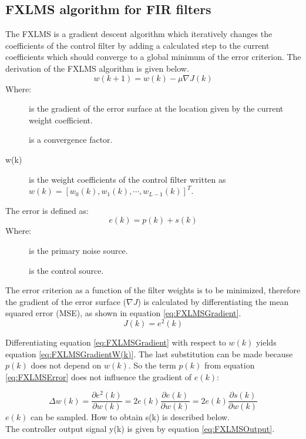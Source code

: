 \subsection{FXLMS algorithm for FIR filters}\label{subsec:fxlms}
The FXLMS is a gradient descent algorithm which iteratively changes the coefficients of the control filter by adding a calculated step to the current coefficients which should converge to a global minimum of the error criterion. The derivation of the FXLMS algorithm is given below. 
\begin{equation}\label{eq:FXLMSNewCoef}
w(k+1) = w(k) - \mu\nabla J(k)
\end{equation}
Where:
\begin{description}
	\item[] is the gradient of the error surface at the location given by the current weight coefficient.
	\item[\text{$\mu$}] is a convergence factor.
	\item[w(k)] is the weight coefficients of the control filter written as  $w(k)=[w_0(k),w_1(k) ,\cdots, w_{L-1}(k)]^T$.
\end{description}
The error is defined as:
\begin{equation}\label{eq:FXLMSError}
e(k) = p(k) + s(k)
\end{equation}
Where:
\begin{description}
	\item[] is the primary noise source.
	\item[] is the control source.
\end{description}

The error criterion as a function of the filter weights is to be minimized, therefore the gradient of the error surface ($\nabla J$) is calculated by differentiating the mean squared error (MSE), as shown in equation \ref{eq:FXLMSGradient}.
\begin{equation}\label{eq:FXLMSGradient}
J(k) = e^2(k)
\end{equation}

Differentiating equation \ref{eq:FXLMSGradient} with respect to $w(k)$ yields equation \ref{eq:FXLMSGradientW(k)}. The last substitution can be made because $p(k)$ does not depend on $w(k)$. So the term $p(k)$ from equation \ref{eq:FXLMSError} does not influence the gradient of $e(k)$:

\begin{equation}\label{eq:FXLMSGradientW(k)}
\Delta w(k) = \frac{\partial e^2(k)}{\partial w(k)} = 2e(k)\frac{\partial e(k)}{\partial w(k)} = 2e(k)\frac{\partial s(k)}{\partial w(k)}
\end{equation}
$e(k)$ can be sampled. How to obtain s(k) is described below. \\
The controller output signal y(k) is given by equation \ref{eq:FXLMSOutput}.


